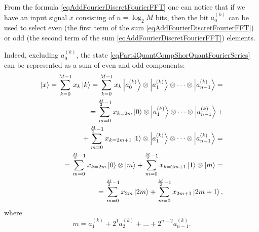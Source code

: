 From the formula \eqref{eqAddFourierDiscretFourierFFT} one can
notice that if we have an input signal $x$ consisting of $n =
\log_2{M}$ 
bits, then the bit $a^{(k)}_0$ can be used to select even
(the first term of the sum \eqref{eqAddFourierDiscretFourierFFT})
or odd 
(the second term of the sum \eqref{eqAddFourierDiscretFourierFFT}) elements.

Indeed, excluding $a^{(k)}_0$, the state
\eqref{eqPart4QuantCompShorQuantFourierSeries} can be represented as
a sum of even and odd components: 
\begin{eqnarray}
\ket{x} = \sum_{k = 0}^{M - 1}x_k \ket{k} = 
\sum_{k = 0}^{M - 1}x_k \ket{a^{(k)}_0} \otimes  \ket{a^{(k)}_1}
\otimes \cdots \otimes \ket{a^{(k)}_{n-1}} = 
\nonumber \\
 = \sum_{m = 0}^{\frac{M}{2} - 1}x_{k=2m} \ket{0} \otimes  \ket{a^{(k)}_1}
\otimes \cdots \otimes \ket{a^{(k)}_{n-1}} +
\nonumber \\
+
\sum_{m = 0}^{\frac{M}{2} - 1}x_{k=2m + 1} \ket{1} \otimes  \ket{a^{(k)}_1}
\otimes \cdots \otimes \ket{a^{(k)}_{n-1}} = 
\nonumber \\
 = \sum_{m = 0}^{\frac{M}{2} - 1}x_{k=2m} \ket{0} \otimes  \ket{m} +
\sum_{m = 0}^{\frac{M}{2} - 1}x_{k=2m + 1} \ket{1} \otimes  \ket{m} = 
\nonumber \\
= \sum_{m = 0}^{\frac{M}{2} - 1}x_{2m} \ket{2m} +
\sum_{m = 0}^{\frac{M}{2} - 1}x_{2m + 1} \ket{2m+1},
\nonumber
\end{eqnarray}
where
\begin{equation}
m = a^{(k)}_1 + 2^1 a^{(k)}_2 + \dots + 2^{n-2} a^{(k)}_{n-1}.
\nonumber
\end{equation}



